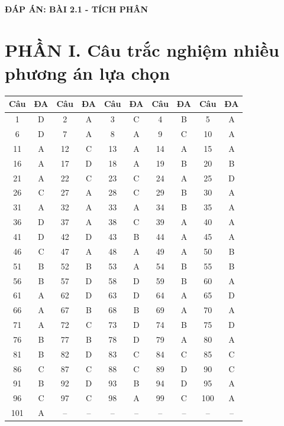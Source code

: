 \documentclass[12pt]{article}
\begin{document}
\begin{center}
	\LARGE \textbf{ĐÁP ÁN: BÀI 2.1 - TÍCH PHÂN}
\end{center}

\vspace{0.5cm}

\section*{PHẦN I. Câu trắc nghiệm nhiều phương án lựa chọn}
\begin{center}
	\begin{tabular}{|c|c|c|c|c|c|c|c|c|c|}
		\hline
		\textbf{Câu} & \textbf{ĐA} & \textbf{Câu} & \textbf{ĐA} & \textbf{Câu} & \textbf{ĐA} & \textbf{Câu} & \textbf{ĐA} & \textbf{Câu} & \textbf{ĐA} \\
		\hline
		1 & D & 2 & A & 3 & C & 4 & B & 5 & A \\
		\hline
		6 & D & 7 & A & 8 & A & 9 & C & 10 & A \\
		\hline
		11 & A & 12 & C & 13 & A & 14 & A & 15 & A \\
		\hline
		16 & A & 17 & D & 18 & A & 19 & B & 20 & B \\
		\hline
		21 & A & 22 & C & 23 & C & 24 & A & 25 & D \\
		\hline
		26 & C & 27 & A & 28 & C & 29 & B & 30 & A \\
		\hline
		31 & A & 32 & A & 33 & A & 34 & B & 35 & A \\
		\hline
		36 & D & 37 & A & 38 & C & 39 & A & 40 & A \\
		\hline
		41 & D & 42 & D & 43 & B & 44 & A & 45 & A \\
		\hline
		46 & C & 47 & A & 48 & A & 49 & A & 50 & B \\
		\hline
		51 & B & 52 & B & 53 & A & 54 & B & 55 & B \\
		\hline
		56 & B & 57 & D & 58 & D & 59 & B & 60 & A \\
		\hline
		61 & A & 62 & D & 63 & D & 64 & A & 65 & D \\
		\hline
		66 & A & 67 & B & 68 & B & 69 & A & 70 & A \\
		\hline
		71 & A & 72 & C & 73 & D & 74 & B & 75 & D \\
		\hline
		76 & B & 77 & B & 78 & D & 79 & A & 80 & A \\
		\hline
		81 & B & 82 & D & 83 & C & 84 & C & 85 & C \\
		\hline
		86 & C & 87 & C & 88 & C & 89 & D & 90 & C \\
		\hline
		91 & B & 92 & D & 93 & B & 94 & D & 95 & A \\
		\hline
		96 & C & 97 & C & 98 & A & 99 & C & 100 & A \\
		\hline
		101 & A & -- & -- & -- & -- & -- & -- & -- & -- \\
		\hline
	\end{tabular}
\end{center}
\end{document}

